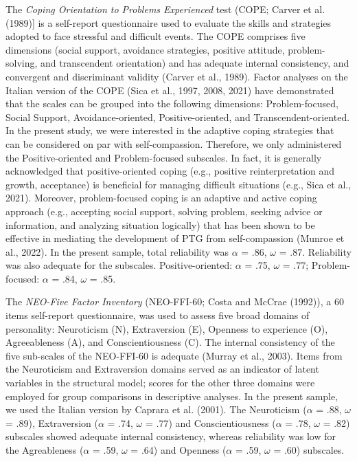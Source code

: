 \documentclass[
  man]{apa7}
\begin{document}
The \emph{Coping Orientation to Problems Experienced} test (COPE; Carver et al. (1989){]} is a self-report questionnaire used to evaluate the skills and strategies adopted to face stressful and difficult events. The COPE comprises five dimensions (social support, avoidance strategies, positive attitude, problem-solving, and transcendent orientation) and has adequate internal consistency, and convergent and discriminant validity (Carver et al., 1989). Factor analyses on the Italian version of the COPE (Sica et al., 1997, 2008, 2021) have demonstrated that the scales can be grouped into the following dimensions: Problem-focused, Social Support, Avoidance-oriented, Positive-oriented, and Transcendent-oriented. In the present study, we were interested in the adaptive coping strategies that can be considered on par with self-compassion. Therefore, we only administered the Positive-oriented and Problem-focused subscales. In fact, it is generally acknowledged that positive-oriented coping (e.g., positive reinterpretation and growth, acceptance) is beneficial for managing difficult situations (e.g., Sica et al., 2021). Moreover, problem-focused coping is an adaptive and active coping approach (e.g., accepting social support, solving problem, seeking advice or information, and analyzing situation logically) that has been shown to be effective in mediating the development of PTG from self-compassion (Munroe et al., 2022). In the present sample, total reliability was \(\alpha\) = .86, \(\omega\) = .87. Reliability was also adequate for the subscales. Positive-oriented: \(\alpha\) = .75, \(\omega\) = .77; Problem-focused: \(\alpha\) = .84, \(\omega\) = .85.

The \emph{NEO-Five Factor Inventory} (NEO-FFI-60; Costa and McCrae (1992)), a 60 items self-report questionnaire, was used to assess five broad domains of personality: Neuroticism (N), Extraversion (E), Openness to experience (O), Agreeableness (A), and Conscientiousness (C). The internal consistency of the five sub-scales of the NEO-FFI-60 is adequate (Murray et al., 2003). Items from the Neuroticism and Extraversion domains served as an indicator of latent variables in the structural model; scores for the other three domains were employed for group comparisons in descriptive analyses. In the present sample, we used the Italian version by Caprara et al. (2001). The Neuroticism (\(\alpha\) = .88, \(\omega\) = .89), Extraversion (\(\alpha\) = .74, \(\omega\) = .77) and Conscientiousness (\(\alpha\) = .78, \(\omega\) = .82) subscales showed adequate internal consistency, whereas reliability was low for the Agreableness (\(\alpha\) = .59, \(\omega\) = .64) and Openness (\(\alpha\) = .59, \(\omega\) = .60) subscales.
\end{document}
